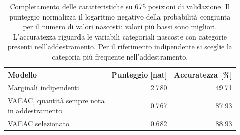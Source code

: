 \begin{table}[htbp]
\centering
\small
\begin{tabular}{@{}lrr@{}}
\toprule
\textbf{Modello} & \textbf{Punteggio [nat]} & \textbf{Accuratezza [\%]}\\
\midrule
Marginali indipendenti & \num{2.780} & \num{49.71} \\
\shortstack[l]{VAEAC, quantità sempre nota\\in addestramento} & \num{0.767} & \num{87.93} \\
VAEAC selezionato & \num{0.682} & \num{88.93} \\
\bottomrule
\end{tabular}
\caption{Completamento delle caratteristiche su 675 posizioni di validazione. Il punteggio normalizza il logaritmo negativo della probabilità congiunta per il numero di valori nascosti: valori più bassi sono migliori. L'accuratezza riguarda le variabili categoriali nascoste con categorie presenti nell'addestramento. Per il riferimento indipendente si sceglie la categoria più frequente nell'addestramento.}
\label{tab:feature-generation-comparison}
\end{table}
